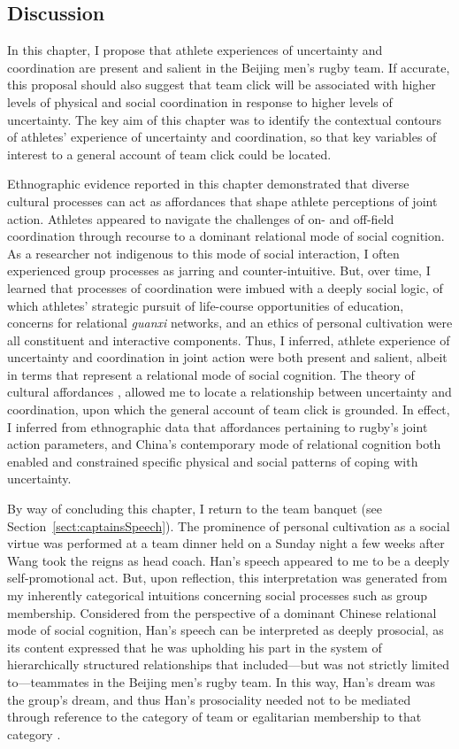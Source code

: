 \begin{CJK}{UTF8}{gbsn}
\section{Discussion\label{sect:discussEthnoField}}
In this chapter, I propose that athlete experiences of uncertainty and coordination are present and salient in the Beijing men's rugby team.  If accurate, this proposal should also suggest that team click will be associated with higher levels of physical and social coordination in response to higher levels of uncertainty.  The key aim of this chapter was to identify the contextual contours of athletes' experience of uncertainty and coordination, so that key variables of interest to a general account of team click could be located.

Ethnographic evidence reported in this chapter demonstrated that diverse cultural processes can act as affordances that shape athlete perceptions of joint action.  Athletes appeared to navigate the challenges of on- and off-field coordination through recourse to a dominant relational mode of social cognition.  As a researcher not indigenous to this mode of social interaction, I often experienced group processes as jarring and counter-intuitive.  But, over time, I learned that processes of coordination were imbued with a deeply social logic, of which athletes' strategic pursuit of life-course opportunities of education, concerns for relational \textit{guanxi} networks, and an ethics of personal cultivation were all constituent and interactive components.  Thus, I inferred, athlete experience of uncertainty and coordination in joint action were both present and salient, albeit in terms that represent a relational mode of social cognition.  The theory of cultural affordances \citep{Ramstead2016}, allowed me to locate a relationship between uncertainty and coordination, upon which the general account of team click is grounded.  In effect, I inferred from ethnographic data that affordances pertaining to rugby's joint action parameters, and China's contemporary mode of relational cognition both enabled and constrained specific physical and social patterns of coping with uncertainty.

By way of concluding this chapter, I return to the team banquet (see Section~\ref{sect:captainsSpeech}).  The prominence of personal cultivation as a social virtue was performed at a team dinner held on a Sunday night a few weeks after Wang took the reigns as head coach.  Han's speech appeared to me to be a deeply self-promotional act. But, upon reflection, this interpretation was generated from my inherently categorical intuitions concerning social processes such as group membership.  Considered from the perspective of a dominant Chinese relational mode of social cognition, Han's speech can be interpreted as deeply prosocial, as its content expressed that he was upholding his part in the system of hierarchically structured relationships that included---but was not strictly limited to---teammates in the Beijing men's rugby team.  In this way, Han's dream was the group's dream, and thus Han's prosociality needed not to be mediated through reference to the category of team or egalitarian membership to that category \citep{Liu2009}.


\end{CJK}
